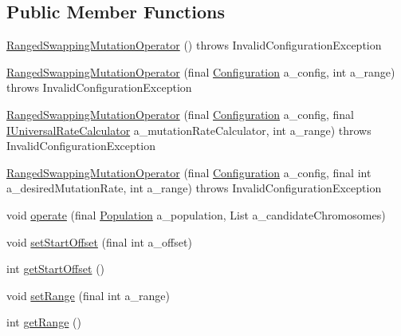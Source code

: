 \subsection*{Public Member Functions}
\begin{DoxyCompactItemize}
\item 
\hyperlink{classorg_1_1jgap_1_1impl_1_1_ranged_swapping_mutation_operator_a35ea1a18c36e12c7bf675310b12aa86e}{Ranged\-Swapping\-Mutation\-Operator} ()  throws Invalid\-Configuration\-Exception 
\item 
\hyperlink{classorg_1_1jgap_1_1impl_1_1_ranged_swapping_mutation_operator_a4678502304c40be60b23141c979ea14c}{Ranged\-Swapping\-Mutation\-Operator} (final \hyperlink{classorg_1_1jgap_1_1_configuration}{Configuration} a\-\_\-config, int a\-\_\-range)  throws Invalid\-Configuration\-Exception 
\item 
\hyperlink{classorg_1_1jgap_1_1impl_1_1_ranged_swapping_mutation_operator_a23ddba164295b294887273330026e29f}{Ranged\-Swapping\-Mutation\-Operator} (final \hyperlink{classorg_1_1jgap_1_1_configuration}{Configuration} a\-\_\-config, final \hyperlink{interfaceorg_1_1jgap_1_1_i_universal_rate_calculator}{I\-Universal\-Rate\-Calculator} a\-\_\-mutation\-Rate\-Calculator, int a\-\_\-range)  throws Invalid\-Configuration\-Exception 
\item 
\hyperlink{classorg_1_1jgap_1_1impl_1_1_ranged_swapping_mutation_operator_affa6c69ace3bab39d5f12a2cc2be1732}{Ranged\-Swapping\-Mutation\-Operator} (final \hyperlink{classorg_1_1jgap_1_1_configuration}{Configuration} a\-\_\-config, final int a\-\_\-desired\-Mutation\-Rate, int a\-\_\-range)  throws Invalid\-Configuration\-Exception 
\item 
void \hyperlink{classorg_1_1jgap_1_1impl_1_1_ranged_swapping_mutation_operator_a2dc5fd550c25cd9d648c0aa81e4052e9}{operate} (final \hyperlink{classorg_1_1jgap_1_1_population}{Population} a\-\_\-population, List a\-\_\-candidate\-Chromosomes)
\item 
void \hyperlink{classorg_1_1jgap_1_1impl_1_1_ranged_swapping_mutation_operator_adb87c71a655a20bf71f8589b46ecd57d}{set\-Start\-Offset} (final int a\-\_\-offset)
\item 
int \hyperlink{classorg_1_1jgap_1_1impl_1_1_ranged_swapping_mutation_operator_ab6d657b9788f18c624890012a6fd53c0}{get\-Start\-Offset} ()
\item 
void \hyperlink{classorg_1_1jgap_1_1impl_1_1_ranged_swapping_mutation_operator_a963136647cc862e573ee80b9bb438376}{set\-Range} (final int a\-\_\-range)
\item 
int \hyperlink{classorg_1_1jgap_1_1impl_1_1_ranged_swapping_mutation_operator_a5c76d0572db4cbf31d95d979e93e5f47}{get\-Range} ()
\end{DoxyCompactItemize}
